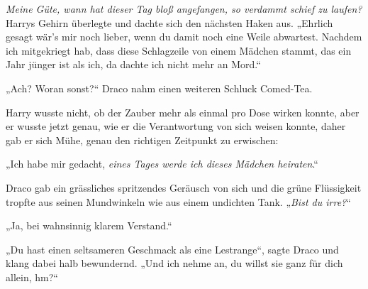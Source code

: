 
\emph{Meine Güte, wann hat dieser Tag bloß angefangen, so verdammt schief zu laufen?} Harrys Gehirn überlegte und dachte sich den nächsten Haken aus.
„Ehrlich gesagt wär’s mir noch lieber, wenn du damit noch eine Weile abwartest. Nachdem ich mitgekriegt hab, dass diese Schlagzeile von einem Mädchen stammt, das ein Jahr jünger ist als ich, da dachte ich nicht mehr an Mord.“

„Ach? Woran sonst?“ Draco nahm einen weiteren Schluck Comed-Tea.

Harry wusste nicht, ob der Zauber mehr als einmal pro Dose wirken konnte, aber er wusste jetzt genau, wie er die Verantwortung von sich weisen konnte, daher gab er sich Mühe, genau den richtigen Zeitpunkt zu erwischen:

„Ich habe mir gedacht, \emph{eines Tages werde ich dieses Mädchen heiraten}.“

Draco gab ein grässliches spritzendes Geräusch von sich und die grüne Flüssigkeit tropfte aus seinen Mundwinkeln wie aus einem undichten Tank.
„\emph{Bist du irre?}“

„Ja, bei wahnsinnig klarem Verstand.“

„Du hast einen seltsameren Geschmack als eine Lestrange“, sagte Draco und klang dabei halb bewundernd.
„Und ich nehme an, du willst sie ganz für dich allein, hm?“

